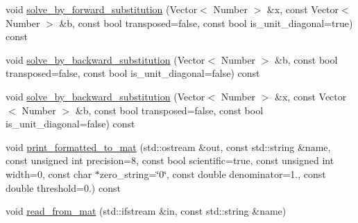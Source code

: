 \begin{DoxyCompactItemize}
\item 
void \hyperlink{classLAPACKFullMatrixExt_a865aa33c5a63bc68851e4685ce3b1379}{solve\+\_\+by\+\_\+forward\+\_\+substitution} (Vector$<$ Number $>$ \&x, const Vector$<$ Number $>$ \&b, const bool transposed=false, const bool is\+\_\+unit\+\_\+diagonal=true) const
\item 
void \hyperlink{classLAPACKFullMatrixExt_ac36f444148f8a0d3972867a0e79f887e}{solve\+\_\+by\+\_\+backward\+\_\+substitution} (Vector$<$ Number $>$ \&b, const bool transposed=false, const bool is\+\_\+unit\+\_\+diagonal=false) const
\item 
void \hyperlink{classLAPACKFullMatrixExt_ac81fbff25894b934408d8329c953ba5a}{solve\+\_\+by\+\_\+backward\+\_\+substitution} (Vector$<$ Number $>$ \&x, const Vector$<$ Number $>$ \&b, const bool transposed=false, const bool is\+\_\+unit\+\_\+diagonal=false) const
\item 
void \hyperlink{classLAPACKFullMatrixExt_aae17980cb1bd3802fdc4a629040b6ed7}{print\+\_\+formatted\+\_\+to\+\_\+mat} (std\+::ostream \&out, const std\+::string \&name, const unsigned int precision=8, const bool scientific=true, const unsigned int width=0, const char $\ast$zero\+\_\+string=\char`\"{}0\char`\"{}, const double denominator=1., const double threshold=0.) const
\item 
void \hyperlink{classLAPACKFullMatrixExt_a3188024ca9775667de38d03fd07ac525}{read\+\_\+from\+\_\+mat} (std\+::ifstream \&in, const std\+::string \&name)
\end{DoxyCompactItemize}
